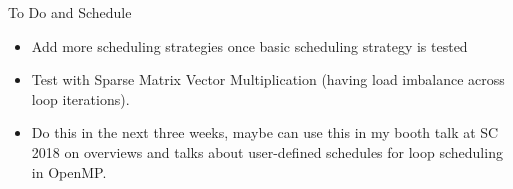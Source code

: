 \documentclass{beamer}
\begin{document}
\begin{frame}{To Do and Schedule}
\begin{itemize}
\item Add more scheduling strategies once basic scheduling strategy is tested
\item Test with Sparse Matrix Vector Multiplication (having load imbalance across loop iterations).
\item Do this in the next three weeks, maybe can use this in my booth talk at SC 2018 on overviews and talks about user-defined schedules for loop scheduling in OpenMP.
\end{itemize}
\end{frame}
\end{document}
